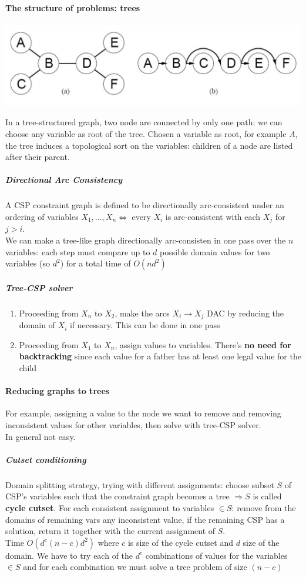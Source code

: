 \documentclass[10pt]{report}
\begin{document}
\paragraph{The structure of problems: trees}
\begin{center}
	\includegraphics[scale=0.5]{9.png}
\end{center}
In a tree-structured graph, two node are connected by only one path: we can choose any variable as root of the tree. Chosen a variable as root, for example $A$, the tree induces a topological sort on the variables: children of a node are listed after their parent.
\subparagraph{Directional Arc Consistency} A CSP constraint graph is defined to be directionally arc-consistent under an ordering of variables $X_1,\ldots,X_n \Leftrightarrow$ every $X_i$ is arc-consistent with each $X_j$ for $j>i$.\\
We can make a tree-like graph directionally arc-consisten in one pass over the $n$ variables: each step must compare up to $d$ possible domain values for two variables (so $d^2$) for a total time of $O(nd^2)$
\subparagraph{Tree-CSP solver}\begin{enumerate}
	\item Proceeding from $X_n$ to $X_2$, make the arcs $X_i\rightarrow X_j$ DAC by reducing the domain of $X_i$ if necessary. This can be done in one pass
	\item Proceeding from $X_1$ to $X_n$, assign values to variables. There's \textbf{no need for backtracking} since each value for a father has at least one legal value for the child
\end{enumerate}
\paragraph{Reducing graphs to trees} For example, assigning a value to the node we want to remove and removing inconsistent values for other variables, then solve with tree-CSP solver.\\
In general not easy.
\subparagraph{Cutset conditioning} Domain splitting strategy, trying with different assignments: choose subset $S$ of CSP's variables such that the constraint graph becomes a tree $\Rightarrow S$ is called \textbf{cycle cutset}. For each consistent assignment to variables $\in S$: remove from the domains of remaining vars any inconsistent value, if the remaining CSP has a solution, return it together with the current assignment of $S$.\\
Time $O(d^c(n-c)d^2)$ where $c$ is size of the cycle cutset and $d$ size of the domain. We have to try each of the $d^c$ combinations of values for the variables $\in S$ and for each combination we must solve a tree problem of size $(n-c)$
\end{document}
